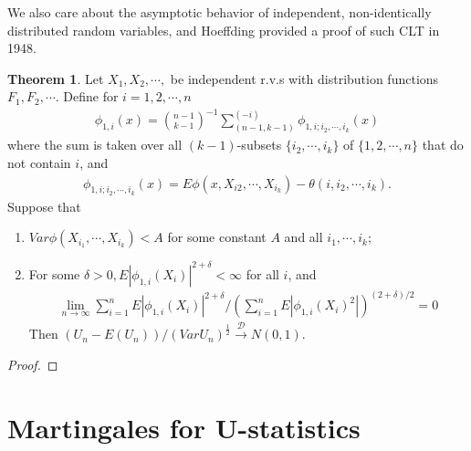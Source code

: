 \documentclass{article}
\theoremstyle{definition}
\newtheorem{theorem}{Theorem}
\numberwithin{Def}{section}
\begin{document}
    
    We also care about the asymptotic behavior of independent, non-identically distributed random variables, and Hoeffding provided a proof of such CLT in 1948. 
    \begin{theorem}
    Let $X_1, X_2, \cdots,$ be independent r.v.s with distribution functions $F_1, F_2, \cdots$. Define for $i = 1,2, \cdots, n$
    \begin{align}
        \phi_{1,i} (x) = {n-1 \choose k-1}^{-1} \sum_{(n-1, k-1)}^{(-i)} \phi_{1, i; i_2, \cdots, i_k}(x)
    \end{align}
    where the sum is taken over all $(k-1)$-subsets $\{i_2, \cdots, i_k\}$ of $\{1,2, \cdots, n\}$ that do not contain $i$, and 
    \begin{align}
        \phi_{1, i; i_2, \cdots, i_k}(x) = E \phi(x, X_{i2}, \cdots, X_{i_k}) - \theta(i, i_2, \cdots, i_k).
    \end{align}
    Suppose that 
    \begin{enumerate}[label = (\roman*)]
        \item $Var \phi(X_{i_1}, \cdots, X_{i_k} ) < A$ for some constant $A$ and all $i_1, \cdots, i_k$;
        \item For some $\delta > 0, E|\phi_{1, i} (X_i) |^{2 + \delta} < \infty$ for all $i$, and 
        \begin{align}
            \lim_{n \rightarrow \infty} \sum_{i =1}^{n} E|\phi_{1, i} (X_i) |^{2 + \delta} \Big/ (\sum_{i =1}^{n} E|\phi_{1, i} (X_i)^2 |) ^{(2 + \delta)/2} = 0
        \end{align}
       Then $(U_n - E(U_n)) / (Var U_n)^{\frac{1}{2}} \xrightarrow{\mathcal{D}} N(0,1).$ 
    \end{enumerate}
    \end{theorem}
    
    \begin{proof}
    
    \end{proof}
\section{Martingales for U-statistics}
\end{document}
